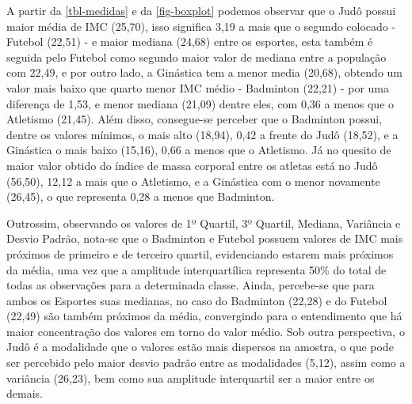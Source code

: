 \documentclass[
]{estat/estat}
\begin{document}
A partir da \ref{tbl-medidas} e da \ref{fig-boxplot} podemos observar
que o Judô possui maior média de IMC (25,70), isso significa 3,19 a mais
que o segundo colocado - Futebol (22,51) - e maior mediana (24,68) entre
os esportes, esta também é seguida pelo Futebol como segundo maior valor
de mediana entre a população com 22,49, e por outro lado, a Ginástica
tem a menor media (20,68), obtendo um valor mais baixo que quarto menor
IMC médio - Badminton (22,21) - por uma diferença de 1,53, e menor
mediana (21,09) dentre eles, com 0,36 a menos que o Atletismo (21,45).
Além disso, consegue-se perceber que o Badminton possui, dentre os
valores mínimos, o mais alto (18,94), 0,42 a frente do Judô (18,52), e a
Ginástica o mais baixo (15,16), 0,66 a menos que o Atletismo. Já no
quesito de maior valor obtido do índice de massa corporal entre os
atletas está no Judô (56,50), 12,12 a mais que o Atletismo, e a
Ginástica com o menor novamente (26,45), o que representa 0,28 a menos
que Badminton.

Outrossim, observando os valores de 1º Quartil, 3º Quartil, Mediana,
Variância e Desvio Padrão, nota-se que o Badminton e Futebol possuem
valores de IMC mais próximos de primeiro e de terceiro quartil,
evidenciando estarem mais próximos da média, uma vez que a amplitude
interquartílica representa 50\% do total de todas as observações para a
determinada classe. Ainda, percebe-se que para ambos os Esportes suas
medianas, no caso do Badminton (22,28) e do Futebol (22,49) são também
próximos da média, convergindo para o entendimento que há maior
concentração dos valores em torno do valor médio. Sob outra perspectiva,
o Judô é a modalidade que o valores estão mais dispersos na amostra, o
que pode ser percebido pelo maior desvio padrão entre as modalidades
(5,12), assim como a variância (26,23), bem como sua amplitude
interquartil ser a maior entre os demais.

\begin{table}[H]

\caption{\label{tbl-tex}Coeficiente de variação dos esportes de
interesse}


\end{table}%
\end{document}

